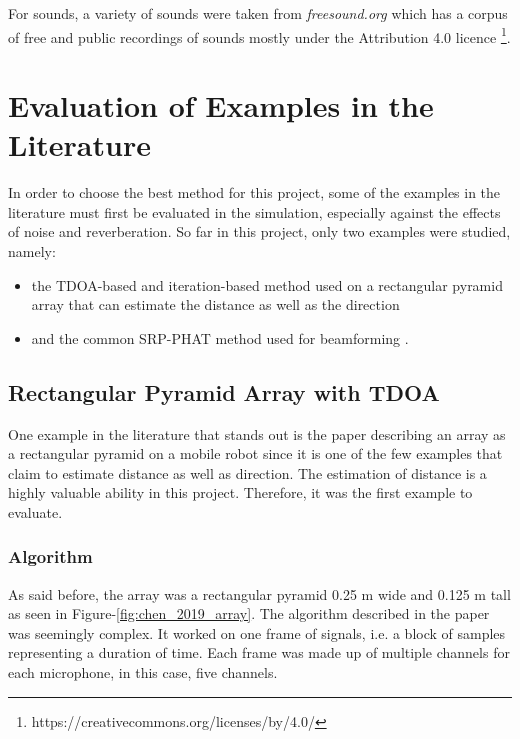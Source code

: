 \documentclass[notitlepage]{report}
\begin{document}
For sounds, a variety of sounds were taken from \textit{freesound.org} which has a corpus of free and public recordings of sounds mostly under the Attribution 4.0 licence \footnote{https://creativecommons.org/licenses/by/4.0/}.

\section{Evaluation of Examples in the Literature}

In order to choose the best method for this project, some of the examples in the literature must first be evaluated in the simulation, especially against the effects of noise and reverberation. So far in this project, only two examples were studied, namely:
\begin{itemize}
	\item the TDOA-based and iteration-based method used on a rectangular pyramid array that can estimate the distance as well as the direction \cite{chen_sound_2019}
	\item and the common SRP-PHAT method used for beamforming \cite{valin_localization_2004} \cite{valin_robust_2007}.
\end{itemize}


\subsection{Rectangular Pyramid Array with TDOA}

One example in the literature that stands out is the paper describing an array as a rectangular pyramid on a mobile robot \cite{chen_sound_2019} since it is one of the few examples that claim to estimate distance as well as direction. The estimation of distance is a highly valuable ability in this project. Therefore, it was the first example to evaluate.

\subsubsection{Algorithm}

As said before, the array was a rectangular pyramid 0.25 \si{m} wide and 0.125 \si{m} tall as seen in Figure-\ref{fig:chen_2019_array}. The algorithm described in the paper \cite{chen_sound_2019} was seemingly complex. It worked on one frame of signals, i.e. a block of samples representing a duration of time. Each frame was made up of multiple channels for each microphone, in this case, five channels. 
\end{document}
